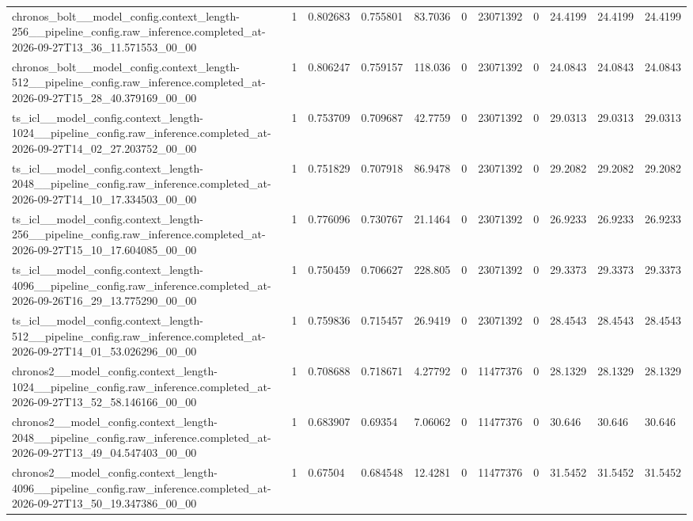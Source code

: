 \begin{tabular}{lllllllllll}
chronos\_bolt\_\_model\_config.context\_length-256\_\_pipeline\_config.raw\_inference.completed\_at-2026-09-27T13\_36\_11.571553\_00\_00 & 1 & 0.802683 & 0.755801 & 83.7036 & 0 & 23071392 & 0 & 24.4199 & 24.4199 & 24.4199 \\
chronos\_bolt\_\_model\_config.context\_length-512\_\_pipeline\_config.raw\_inference.completed\_at-2026-09-27T15\_28\_40.379169\_00\_00 & 1 & 0.806247 & 0.759157 & 118.036 & 0 & 23071392 & 0 & 24.0843 & 24.0843 & 24.0843 \\
ts\_icl\_\_model\_config.context\_length-1024\_\_pipeline\_config.raw\_inference.completed\_at-2026-09-27T14\_02\_27.203752\_00\_00 & 1 & 0.753709 & 0.709687 & 42.7759 & 0 & 23071392 & 0 & 29.0313 & 29.0313 & 29.0313 \\
ts\_icl\_\_model\_config.context\_length-2048\_\_pipeline\_config.raw\_inference.completed\_at-2026-09-27T14\_10\_17.334503\_00\_00 & 1 & 0.751829 & 0.707918 & 86.9478 & 0 & 23071392 & 0 & 29.2082 & 29.2082 & 29.2082 \\
ts\_icl\_\_model\_config.context\_length-256\_\_pipeline\_config.raw\_inference.completed\_at-2026-09-27T15\_10\_17.604085\_00\_00 & 1 & 0.776096 & 0.730767 & 21.1464 & 0 & 23071392 & 0 & 26.9233 & 26.9233 & 26.9233 \\
ts\_icl\_\_model\_config.context\_length-4096\_\_pipeline\_config.raw\_inference.completed\_at-2026-09-26T16\_29\_13.775290\_00\_00 & 1 & 0.750459 & 0.706627 & 228.805 & 0 & 23071392 & 0 & 29.3373 & 29.3373 & 29.3373 \\
ts\_icl\_\_model\_config.context\_length-512\_\_pipeline\_config.raw\_inference.completed\_at-2026-09-27T14\_01\_53.026296\_00\_00 & 1 & 0.759836 & 0.715457 & 26.9419 & 0 & 23071392 & 0 & 28.4543 & 28.4543 & 28.4543 \\
chronos2\_\_model\_config.context\_length-1024\_\_pipeline\_config.raw\_inference.completed\_at-2026-09-27T13\_52\_58.146166\_00\_00 & 1 & 0.708688 & 0.718671 & 4.27792 & 0 & 11477376 & 0 & 28.1329 & 28.1329 & 28.1329 \\
chronos2\_\_model\_config.context\_length-2048\_\_pipeline\_config.raw\_inference.completed\_at-2026-09-27T13\_49\_04.547403\_00\_00 & 1 & 0.683907 & 0.69354 & 7.06062 & 0 & 11477376 & 0 & 30.646 & 30.646 & 30.646 \\
chronos2\_\_model\_config.context\_length-4096\_\_pipeline\_config.raw\_inference.completed\_at-2026-09-27T13\_50\_19.347386\_00\_00 & 1 & 0.67504 & 0.684548 & 12.4281 & 0 & 11477376 & 0 & 31.5452 & 31.5452 & 31.5452 \\

\end{tabular}
